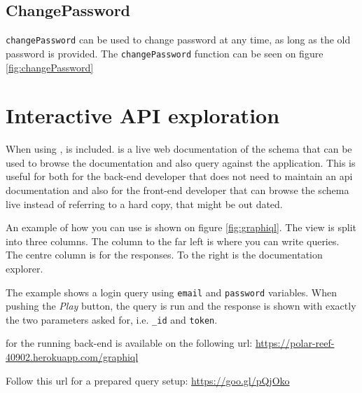\subsection{ChangePassword}
\label{sec:changePassword}
\verb+changePassword+ can be used to change password at any time, as long as the old password is provided.
The \verb+changePassword+ function can be seen on figure \ref{fig:changePassword}

\section{Interactive API exploration}
When using ,  is included.
 is a live web documentation of the schema that can be used to browse the documentation and also query against the application.
This is useful for both for the back-end developer that does not need to maintain an \gls{api} documentation and also for the front-end developer that can browse the schema live instead of referring to a hard copy, that might be out dated.

An example of how you can use  is shown on figure \ref{fig:graphiql}.
The view is split into three columns.
The column to the far left is where you can write queries.
The centre column is for the  responses.
To the right is the documentation explorer.

The example shows a login query using \verb+email+ and \verb+password+ variables.
When pushing the \textit{Play} button, the query is run and the response is shown with exactly the two parameters asked for, i.e. \verb+_id+ and \verb+token+.

 for the running back-end is available on the following \gls{url}: \newline
\url{https://polar-reef-40902.herokuapp.com/graphiql}

Follow this \gls{url} for a prepared query setup: \newline
\url{https://goo.gl/pQjOko}

